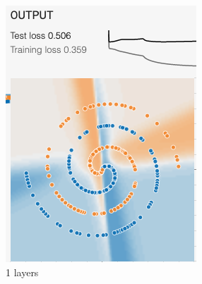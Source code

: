 \documentclass[12pt,a4paper]{article}
\begin{document}
\begin{enumerate}
\begin{figure}[H]
\begin{subfigure}[H]{0.2\textwidth}
				\includegraphics[width=\textwidth]{Figures/hidden/1}
				\caption{1 layers}
			\end{subfigure}
			\begin{subfigure}[H]{0.2\textwidth}
				\centering

\end{subfigure}
\end{figure}
\end{enumerate}
\end{document}
